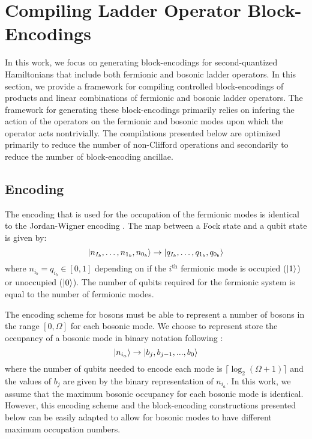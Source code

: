 \section{Compiling Ladder Operator Block-Encodings}
\label{sec:ladder-op-oracles}

In this work, we focus on generating block-encodings for second-quantized Hamiltonians that include both fermionic and bosonic ladder operators.
In this section, we provide a framework for compiling controlled block-encodings of products and linear combinations of fermionic and bosonic ladder operators.
The framework for generating these block-encodings primarily relies on infering the action of the operators on the fermionic and bosonic modes upon which the operator acts nontrivially. 
The compilations presented below are optimized primarily to reduce the number of non-Clifford operations and secondarily to reduce the number of block-encoding ancillae.

\subsection{Encoding}
\label{subsec:encoding}

The encoding that is used for the occupation of the fermionic modes is identical to the Jordan-Wigner encoding \cite{jordan-wigner}.
The map between a Fock state and a qubit state is given by: 
\begin{equation}
    \ket{n_{I_b}, \dots, n_{1_b}, n_{0_b}} \rightarrow \ket{q_{I_b}, \dots, q_{1_b}, q_{0_b}}
\end{equation}
where $n_{i_b} = q_{i_b} \in [0, 1]$ depending on if the $i^\text{th}$ fermionic mode is occupied ($\ket{1}$) or unoccupied ($\ket{0}$).
The number of qubits required for the fermionic system is equal to the number of fermionic modes.

The encoding scheme for bosons must be able to represent a number of bosons in the range $[0, \Omega]$ for each bosonic mode.
We choose to represent store the occupancy of a bosonic mode in binary notation following \cite{rhodes2024exponential}:
\begin{equation}
    \ket{n_{i_a}} \rightarrow \ket{b_j, b_{j-1}, ..., b_0}
\end{equation}
where the number of qubits needed to encode each mode is $\lceil \log_2{(\Omega + 1)} \rceil$ and the values of $b_j$ are given by the binary representation of $n_{i_a}$.
In this work, we assume that the maximum bosonic occupancy for each bosonic mode is identical.
However, this encoding scheme and the block-encoding constructions presented below can be easily adapted to allow for bosonic modes to have different maximum occupation numbers.

